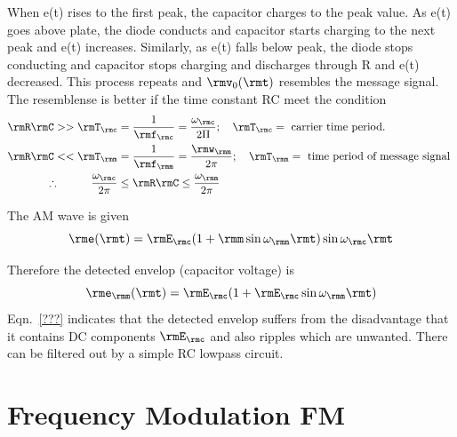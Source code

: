When e(t) rises to the first peak, the capacitor charges to the peak
value. As e(t) goes above plate, the diode conducts and capacitor
starts charging to the next peak and e(t) increases. Similarly, as
e(t) falls below peak, the diode stops conducting and capacitor
stops charging and discharges through R and e(t) decreased. This
process repeats and $\rmv_0(\rmt)$ resembles the message signal. The
resemblense is better if the time constant RC meet the condition
\begin{align*}
\rmR\rmC >> \rmT_\rmc &= \frac{1}{\rmf_\rmc} = \frac{\omega_\rmc}{2\Pi} ;\quad \rmT_\rmc = \text{
carrier time period. } \\
\rmR\rmC << \rmT_\rmm & =  \frac{1}{\rmf_\rmm} = \frac{\rmw_\rmm}{2\pi} ; \quad \rmT_\rmm = \text{
time period of message signal } \\
\therefore \hspace{1cm} \frac{\omega_\rmc}{2\pi}
& \leq \rmR\rmC \leq \frac{\omega_\rmm}{2\pi}  \hspace{1cm}
\end{align*}

The AM wave is given 
\begin{equation*}
\rme(\rmt)= \rmE_\rmc (1+\rmm \sin \omega_\rmn \rmt) \sin \omega_\rmc \rmt 
\end{equation*}

Therefore the detected envelop (capacitor voltage) is 
\begin{equation*}
\rme_\rmm (\rmt) = \rmE_\rmc (1+\rmE_\rmc \sin \omega_\rmm \rmt) 
\end{equation*}
Eqn.~\eqref{???} indicates that the detected envelop suffers from the
disadvantage that it contains DC components $\rmE_\rmc$ and also ripples
which are unwanted. There can be filtered out by a simple RC lowpass circuit.

\section{Frequency Modulation FM}\label{label8.8}

